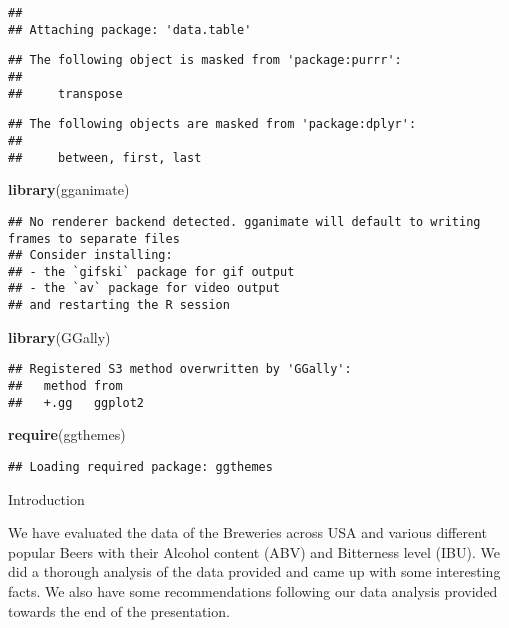 \documentclass[]{article}
\newenvironment{Shaded}{\begin{snugshade}}{\end{snugshade}}
\newcommand{\KeywordTok}[1]{\textcolor[rgb]{0.13,0.29,0.53}{\textbf{#1}}}
\newcommand{\NormalTok}[1]{#1}
\begin{document}
\begin{verbatim}
## 
## Attaching package: 'data.table'
\end{verbatim}

\begin{verbatim}
## The following object is masked from 'package:purrr':
## 
##     transpose
\end{verbatim}

\begin{verbatim}
## The following objects are masked from 'package:dplyr':
## 
##     between, first, last
\end{verbatim}

\begin{Shaded}
\begin{Highlighting}[]
\KeywordTok{library}\NormalTok{(gganimate)}
\end{Highlighting}
\end{Shaded}

\begin{verbatim}
## No renderer backend detected. gganimate will default to writing frames to separate files
## Consider installing:
## - the `gifski` package for gif output
## - the `av` package for video output
## and restarting the R session
\end{verbatim}

\begin{Shaded}
\begin{Highlighting}[]
\KeywordTok{library}\NormalTok{(GGally)}
\end{Highlighting}
\end{Shaded}

\begin{verbatim}
## Registered S3 method overwritten by 'GGally':
##   method from   
##   +.gg   ggplot2
\end{verbatim}

\begin{Shaded}
\begin{Highlighting}[]
\KeywordTok{require}\NormalTok{(ggthemes)}
\end{Highlighting}
\end{Shaded}

\begin{verbatim}
## Loading required package: ggthemes
\end{verbatim}

Introduction

We have evaluated the data of the Breweries across USA and various
different popular Beers with their Alcohol content (ABV) and Bitterness
level (IBU). We did a thorough analysis of the data provided and came up
with some interesting facts. We also have some recommendations following
our data analysis provided towards the end of the presentation.
\end{document}
